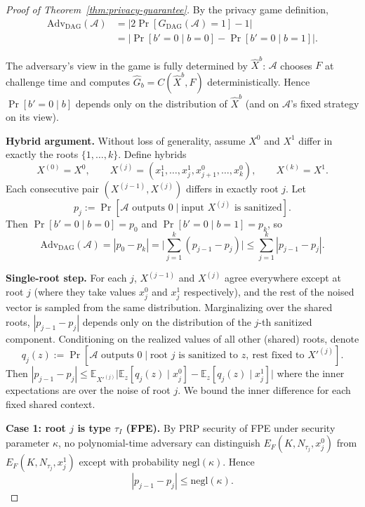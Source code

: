 \begin{proof}[Proof of Theorem~\ref{thm:privacy-guarantee}]
By the privacy game definition,
\begin{align*}
\mathrm{Adv}_{\mathrm{DAG}}(\mathcal{A})
  &= |2\Pr[G_{\mathrm{DAG}}(\mathcal{A}) = 1] - 1| \\
  &= |\Pr[b'{=}0 \mid b{=}0] - \Pr[b'{=}0 \mid b{=}1]|.    
\end{align*}

The adversary's view in the game is fully determined by $\hat{X}^b$: $\mathcal{A}$ chooses $F$ at challenge time and computes $\hat{G}_b = C(\hat{X}^b, F)$ deterministically. Hence $\Pr[b'{=}0 \mid b]$ depends only on the distribution of $\hat{X}^b$ (and on $\mathcal{A}$'s fixed strategy on its view).

\medskip
\noindent\textbf{Hybrid argument.} Without loss of generality, assume $X^0$ and $X^1$ differ in exactly the roots $\{1, \ldots, k\}$. Define hybrids
\[
  X^{(0)} = X^0,\qquad X^{(j)} = (x^1_1, \ldots, x^1_j, x^0_{j+1}, \ldots, x^0_k),\qquad X^{(k)} = X^1.
\]
Each consecutive pair $(X^{(j-1)}, X^{(j)})$ differs in exactly root $j$. Let
\[
  p_j := \Pr[\mathcal{A}\text{ outputs } 0 \mid \text{input } X^{(j)}\text{ is sanitized}].
\]
Then $\Pr[b'{=}0 \mid b{=}0] = p_0$ and $\Pr[b'{=}0 \mid b{=}1] = p_k$, so
\[
  \mathrm{Adv}_{\mathrm{DAG}}(\mathcal{A}) = |p_0 - p_k|
  = \Big| \sum_{j=1}^{k} (p_{j-1} - p_j) \Big|
  \leq \sum_{j=1}^{k} |p_{j-1} - p_j|.
\]

\medskip
\noindent\textbf{Single-root step.} For each $j$, $X^{(j-1)}$ and $X^{(j)}$ agree everywhere except at root $j$ (where they take values $x^0_j$ and $x^1_j$ respectively), and the rest of the noised vector is sampled from the same distribution. Marginalizing over the shared roots, $|p_{j-1} - p_j|$ depends only on the distribution of the $j$-th sanitized component. Conditioning on the realized values of all other (shared) roots, denote
\[
  q_j(z) := \Pr[\mathcal{A}\text{ outputs } 0 \mid \text{root $j$ is sanitized to } z,\ \text{rest fixed to } X'^{(j)}].
\]
Then $|p_{j-1} - p_j| \leq \mathbb{E}_{X'^{(j)}}\big| \mathbb{E}_z[q_j(z) \mid x^0_j] - \mathbb{E}_z[q_j(z) \mid x^1_j] \big|$ where the inner expectations are over the noise of root $j$. We bound the inner difference for each fixed shared context.

\medskip
\noindent\textbf{Case 1: root $j$ is type $\tau_I$ (FPE).} By PRP security of FPE under security parameter $\kappa$, no polynomial-time adversary can distinguish $E_F(K, N_{\tau_j}, x^0_j)$ from $E_F(K, N_{\tau_j}, x^1_j)$ except with probability $\mathrm{negl}(\kappa)$. Hence
\[
  |p_{j-1} - p_j| \leq \mathrm{negl}(\kappa).
\]


\end{proof}
